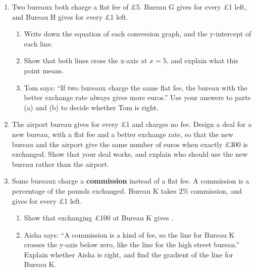 \documentclass[12pt,a4paper]{article}
\begin{document}
\begin{enumerate}[resume]

\item Two bureaux both charge a flat fee of \pounds5. Bureau G gives
 for every \pounds1 left, and Bureau H gives  for
every \pounds1 left.
\begin{enumerate}
  \item Write down the equation of each conversion graph, and the y-intercept
        of each line.

        \vspace{4.5em}
  \item Show that both lines cross the x-axis at $x=5$, and explain what this
        point means.

        \vspace{6em}
  \item Tom says: ``If two bureaux charge the same flat fee, the bureau with
        the better exchange rate always gives more euros.'' Use your answers
        to parts (a) and (b) to decide whether Tom is right.

        \vspace{8em}
\end{enumerate}

\item The airport bureau gives  for every \pounds1 and charges no
fee. Design a deal for a new bureau, with a flat fee and a better exchange
rate, so that the new bureau and the airport give the same number of euros
when exactly \pounds300 is exchanged. Show that your deal works, and explain
who should use the new bureau rather than the airport.

\vspace{12em}

\newpage

\item Some bureaux charge a \textbf{commission} instead of a flat fee. A
commission is a percentage of the pounds exchanged. Bureau K takes $2\%$
commission, and gives  for every \pounds1 left.
\begin{enumerate}
  \item Show that exchanging \pounds100 at Bureau K gives .

        \vspace{5em}
  \item Aisha says: ``A commission is a kind of fee, so the line for Bureau K
        crosses the y-axis below zero, like the line for the high street
        bureau.'' Explain whether Aisha is right, and find the gradient of the
        line for Bureau K.


\end{enumerate}
\end{enumerate}
\end{document}
